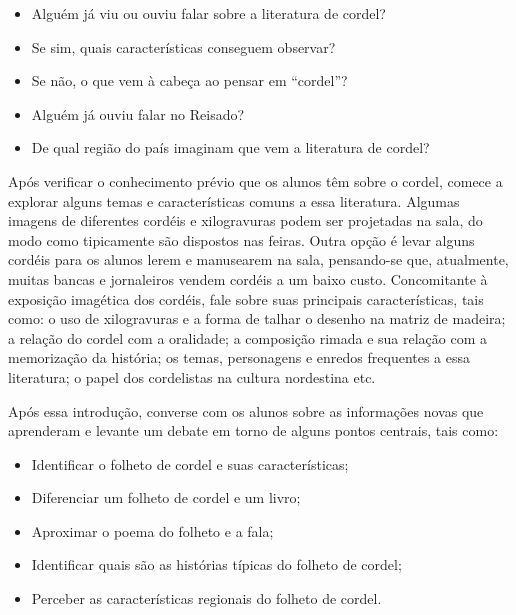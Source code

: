 \documentclass[11pt]{extarticle}
\begin{document}
\begin{itemize}
\item Alguém já viu ou ouviu falar sobre a literatura de cordel?

\item Se sim, quais características conseguem observar?

\item Se não, o que vem à cabeça ao pensar em ``cordel''?

\item Alguém já ouviu falar no Reisado?

\item De qual região do país imaginam que vem a literatura de cordel?
\end{itemize}


Após verificar o conhecimento prévio que os alunos têm sobre o cordel, comece a explorar alguns temas e características comuns a essa literatura. Algumas imagens de diferentes cordéis e xilogravuras podem ser projetadas na sala, do modo como tipicamente são dispostos nas feiras. Outra opção é levar alguns cordéis para os alunos lerem e manusearem na sala, pensando-se que, atualmente, muitas bancas e jornaleiros vendem cordéis a um baixo custo.
Concomitante à exposição imagética dos cordéis, fale sobre suas principais características, tais como: o uso de xilogravuras e a forma de talhar o desenho na matriz de madeira; a relação do cordel com a oralidade; a composição rimada e sua relação com a memorização da história; os temas, personagens e enredos frequentes a essa literatura; o papel dos cordelistas na cultura nordestina etc.

Após essa introdução, converse com os alunos sobre as informações novas que aprenderam e levante um debate em torno de alguns pontos centrais, tais como:

\begin{itemize}
\item Identificar o folheto de cordel e suas características;

\item Diferenciar um folheto de cordel e um livro;

\item Aproximar o poema do folheto e a fala;

\item Identificar quais são as histórias típicas do folheto de cordel;

\item Perceber as características regionais do folheto de cordel.
\end{itemize}
\end{document}
